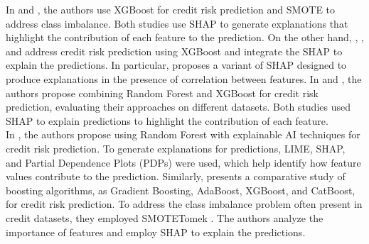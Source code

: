 {    %
    In \cite{zhou2025enhancing} and \cite{nobel2024unmasking}, the authors use XGBoost for credit risk prediction and SMOTE to address class imbalance. Both studies use SHAP to generate explanations that highlight the contribution of each feature to the prediction. On the other hand, \cite{do2024explainable}, \cite{hernes2023credit}, and \cite{chang2024credit} address credit risk prediction using XGBoost and integrate the SHAP to explain the predictions. In particular, \cite{chang2024credit} proposes a variant of SHAP designed to produce explanations in the presence of correlation between features. %
    In \cite{baisholan2025fraudx} and \cite{sun2025enhancing}, the authors propose combining Random Forest and XGBoost for credit risk prediction, evaluating their approaches on different datasets. Both studies used SHAP to explain predictions to highlight the contribution of each feature. \\%
    
    In \cite{nallakaruppan2024explainable}, the authors propose using Random Forest with explainable AI techniques for credit risk prediction. To generate explanations for predictions, LIME, SHAP, and Partial Dependence Plots (PDPs) were used, which help identify how feature values contribute to the prediction. Similarly, \cite{nguyen2025comparative} presents a comparative study of boosting algorithms, as Gradient Boosting, AdaBoost, XGBoost, and CatBoost, for credit risk prediction. To address the class imbalance problem often present in credit datasets, they employed SMOTETomek \cite{batista2003balancing}. The authors analyze the importance of features and employ SHAP to explain the predictions.\\

}
